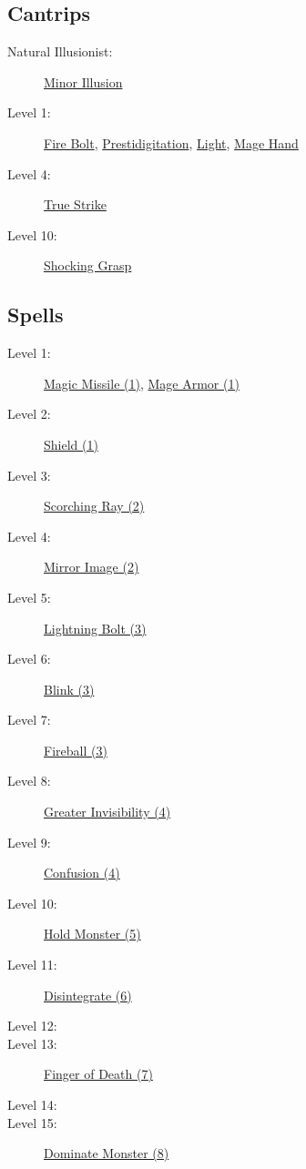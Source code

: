\documentclass[letterpaper,10pt,twoside,twocolumn,openany]{book}
\begin{document}
\subsection{Cantrips}

\begin{description}
	\item[Natural Illusionist:] \hyperlink{Minor Illusion}{Minor Illusion}
	\item[Level 1:] \hyperlink{Fire Bolt}{Fire Bolt}, \hyperlink{Prestidigitation}{Prestidigitation}, \hyperlink{Light}{Light}, \hyperlink{Mage Hand}{Mage Hand}
	\item[Level 4:] \hyperlink{True Strike}{True Strike}
	\item[Level 10:] \hyperlink{Shocking Grasp}{Shocking Grasp}
\end{description}

\subsection{Spells}

\begin{description}
	\item[Level 1:] \hyperlink{Magic Missile (1)}{Magic Missile (1)}, \hyperlink{Mage Armor (1)}{Mage Armor (1)}
	\item[Level 2:] \hyperlink{Shield (1)}{Shield (1)}
	\item[Level 3:] \hyperlink{Scorching Ray (2)}{Scorching Ray (2)}	 
	\item[Level 4:] \hyperlink{Mirror Image (2)}{Mirror Image (2)}
	\item[Level 5:] \hyperlink{Lightning Bolt (3)}{Lightning Bolt (3)}
	\item[Level 6:] \hyperlink{Blink (3)}{Blink (3)}
	\item[Level 7:] \hyperlink{Fireball (3)}{Fireball (3)}
	\item[Level 8:] \hyperlink{Greater Invisibility (4)}{Greater Invisibility (4)}
	\item[Level 9:] \hyperlink{Confusion (4)}{Confusion (4)}
	\item[Level 10:] \hyperlink{Hold Monster (5)}{Hold Monster (5)}
	\item[Level 11:] \hyperlink{Disintegrate (6)}{Disintegrate (6)}
	\item[Level 12:]
	\item[Level 13:] \hyperlink{Finger of Death (7)}{Finger of Death (7)}
	\item[Level 14:] 
	\item[Level 15:] \hyperlink{Dominate Monster (8)}{Dominate Monster (8)}
\end{description}
\end{document}
